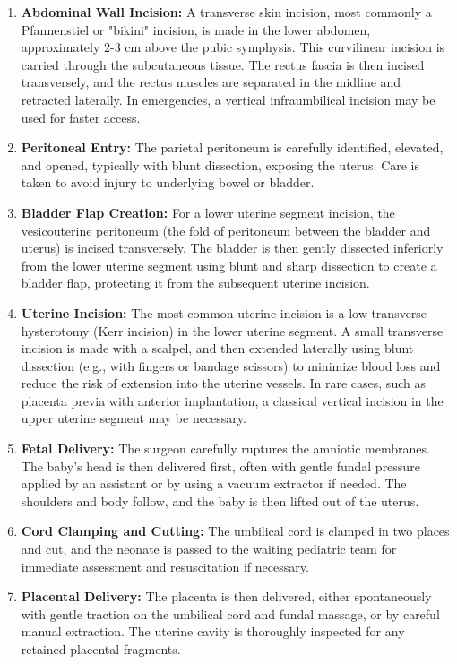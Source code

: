 \begin{enumerate}
  \item \textbf{Abdominal Wall Incision:} A transverse skin incision, most commonly a Pfannenstiel or "bikini" incision, is made in the lower abdomen, approximately 2-3 cm above the pubic symphysis. This curvilinear incision is carried through the subcutaneous tissue. The rectus fascia is then incised transversely, and the rectus muscles are separated in the midline and retracted laterally. In emergencies, a vertical infraumbilical incision may be used for faster access.
  \item \textbf{Peritoneal Entry:} The parietal peritoneum is carefully identified, elevated, and opened, typically with blunt dissection, exposing the uterus. Care is taken to avoid injury to underlying bowel or bladder.
  \item \textbf{Bladder Flap Creation:} For a lower uterine segment incision, the vesicouterine peritoneum (the fold of peritoneum between the bladder and uterus) is incised transversely. The bladder is then gently dissected inferiorly from the lower uterine segment using blunt and sharp dissection to create a bladder flap, protecting it from the subsequent uterine incision.
  \item \textbf{Uterine Incision:} The most common uterine incision is a low transverse hysterotomy (Kerr incision) in the lower uterine segment. A small transverse incision is made with a scalpel, and then extended laterally using blunt dissection (e.g., with fingers or bandage scissors) to minimize blood loss and reduce the risk of extension into the uterine vessels. In rare cases, such as placenta previa with anterior implantation, a classical vertical incision in the upper uterine segment may be necessary.
  \item \textbf{Fetal Delivery:} The surgeon carefully ruptures the amniotic membranes. The baby's head is then delivered first, often with gentle fundal pressure applied by an assistant or by using a vacuum extractor if needed. The shoulders and body follow, and the baby is then lifted out of the uterus.
  \item \textbf{Cord Clamping and Cutting:} The umbilical cord is clamped in two places and cut, and the neonate is passed to the waiting pediatric team for immediate assessment and resuscitation if necessary.
  \item \textbf{Placental Delivery:} The placenta is then delivered, either spontaneously with gentle traction on the umbilical cord and fundal massage, or by careful manual extraction. The uterine cavity is thoroughly inspected for any retained placental fragments.

\end{enumerate}
